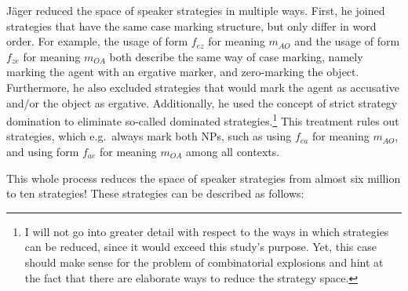 \documentclass[output=paper,hidelinks]{langscibook}
\begin{document}
Jäger reduced the space of speaker strategies in multiple ways. First, he joined strategies that have the same case marking structure, but only differ in word order. For example, the usage of form $f_{ez}$ for meaning $m_{AO}$ and the usage of form $f_{ze}$ for meaning $m_{OA}$ both describe the same way of case marking, namely marking the agent with an ergative marker, and zero-marking the object. Furthermore, he also excluded strategies that would mark the agent as accusative and/or the object as ergative. Additionally, he used the concept of strict strategy domination \citep[cf.][]{Watson2008} to eliminate so-called dominated strategies.\footnote{I will not go into greater detail with respect to the ways in which strategies can be reduced, since it would exceed this study's purpose. 
Yet, this case should make sense for the problem of combinatorial explosions and hint at the fact that there are elaborate ways to reduce the strategy space.} This treatment rules out strategies, which e.g.~always mark both NPs, such as using $f_{ea}$ for meaning $m_{AO}$, and using form $f_{ae}$ for meaning $m_{OA}$ among all contexts.

This whole process reduces the space of speaker strategies from almost six million to ten strategies! These strategies can be described as follows:
\end{document}
